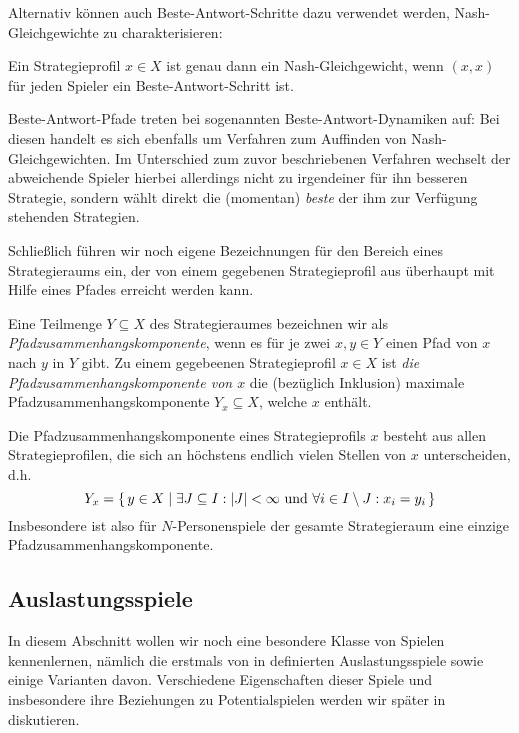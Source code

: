 Alternativ können auch Beste-Antwort-Schritte dazu verwendet werden, Nash-Gleich\-ge\-wich\-te zu charakterisieren:

\begin{beob}\label{beob:BASchritteNG}
	Ein Strategieprofil $x \in X$ ist genau dann ein Nash-Gleichgewicht, wenn $(x,x)$ für jeden Spieler ein Beste-Antwort-Schritt ist.
\end{beob}

Beste-Antwort-Pfade treten bei sogenannten Beste-Antwort-Dynamiken auf: Bei diesen handelt es sich ebenfalls um Verfahren zum Auffinden von Nash-Gleichgewichten. Im Unterschied zum zuvor beschriebenen Verfahren wechselt der abweichende Spieler hierbei allerdings nicht zu irgendeiner für ihn besseren Strategie, sondern wählt direkt die (momentan) \emph{beste} der ihm zur Verfügung stehenden Strategien. 

Schließlich führen wir noch eigene Bezeichnungen für den Bereich eines Strategieraums ein, der von einem gegebenen Strategieprofil aus überhaupt mit Hilfe eines Pfades erreicht werden kann. 

\begin{defn}
	Eine Teilmenge $Y \subseteq X$ des Strategieraumes bezeichnen wir als \emph{Pfadzusammenhangskomponente}, wenn es für je zwei $x, y \in Y$ einen Pfad von $x$ nach $y$ in $Y$ gibt. Zu einem gegebeenen Strategieprofil $x \in X$ ist \emph{die Pfadzusammenhangskomponente von $x$} die (bezüglich Inklusion) maximale Pfadzusammenhangskomponente $Y_x \subseteq X$, welche $x$ enthält.
\end{defn}

\begin{beob}\label{beob:NPersSpieleNureinePfadzshkomp}
	Die Pfadzusammenhangskomponente eines Strategieprofils $x$ besteht aus allen Strategieprofilen, die sich an höchstens endlich vielen Stellen von $x$ unterscheiden, d.h.
	\[Y_x = \set{y \in X | \exists J \subseteq I: \left|J\right| < \infty \text{ und } \forall i \in I\setminus J: x_i = y_i } \]
	Insbesondere ist also für $N$-Personenspiele der gesamte Strategieraum eine einzige Pfadzusammenhangskomponente.
\end{beob}


\subsection{Auslastungsspiele}

In diesem Abschnitt wollen wir noch eine besondere Klasse von Spielen kennenlernen, nämlich die erstmals von \citeauthor{RosenthalPotential} in \cite{RosenthalPotential} definierten Auslastungsspiele sowie einige Varianten davon. Verschiedene Eigenschaften dieser Spiele und insbesondere ihre Beziehungen zu Potentialspielen werden wir später in  diskutieren.

